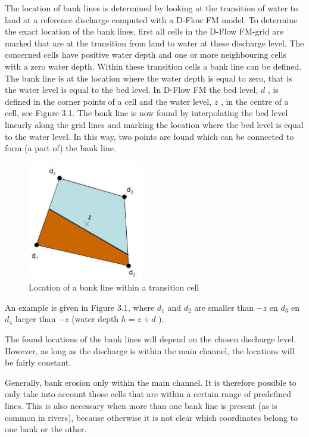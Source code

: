 The location of bank lines is determined by looking at the transition of water to land at a reference discharge computed with a D-Flow FM model.
To determine the exact location of the bank lines, first all cells in the D-Flow FM-grid are marked that are at the transition from land to water at these discharge level.
The concerned cells have positive water depth and one or more neighbouring cells with a zero water depth.
Within these transition cells a bank line can be defined.
The bank line is at the location where the water depth is equal to zero, that is the water level is equal to the bed level.
In D-Flow FM the bed level, $d$ , is defined in the corner points of a cell and the water level, $z$ , in the centre of a cell, see Figure 3.1.
The bank line is now found by interpolating the bed level linearly along the grid lines and marking the location where the bed level is equal to the water level.
In this way, two points are found which can be connected to form (a part of) the bank line.

\begin{figure}
\includegraphics[width=5cm]{figures/Fig3-1.png}
\caption{Location of a bank line within a transition cell}
\label{Fig3.1}
\end{figure}

An example is given in Figure 3.1, where $d_1$ and $d_2$ are smaller than $-z$ en $d_3$ en $d_4$ larger than $-z$ (water depth $h = z+d$ ).

The found locations of the bank lines will depend on the chosen discharge level.
However, as long as the discharge is within the main channel, the locations will be fairly constant.

Generally, bank erosion only within the main channel.
It is therefore possible to only take into account those cells that are within a certain range of predefined lines.
This is also necessary when more than one bank line is present (as is common in rivers), because otherwise it is not clear which coordinates belong to one bank or the other.

